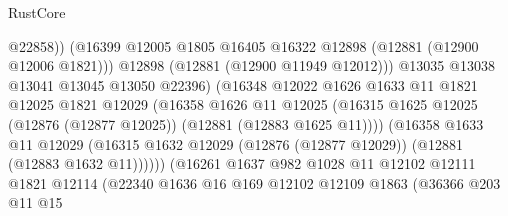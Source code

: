 \begin{lexlean}{RustCore}
\begin{coremodule}
                                      @22858))
                                  (@16399
                                    @12005
                                    @1805
                                    @16405
                                    @16322
                                    @12898
                                    (@12881 (@12900 @12006 @1821)))
                                  @12898
                                  (@12881 (@12900 @11949 @12012)))
                                @13035
                                @13038
                                @13041
                                @13045
                                @13050
                                @22396)
                              (@16348
                                @12022
                                @1626
                                @1633
                                @11
                                @1821
                                @12025
                                @1821
                                @12029
                                (@16358
                                  @1626
                                  @11
                                  @12025
                                  (@16315
                                    @1625
                                    @12025
                                    (@12876 (@12877 @12025))
                                    (@12881 (@12883 @1625 @11))))
                                (@16358
                                  @1633
                                  @11
                                  @12029
                                  (@16315
                                    @1632
                                    @12029
                                    (@12876 (@12877 @12029))
                                    (@12881 (@12883 @1632 @11))))))
                            (@16261
                              @1637
                              @982
                              @1028
                              @11
                              @12102
                              @12111
                              @1821
                              @12114
                              (@22340
                                @1636
                                @16
                                @169
                                @12102
                                @12109
                                @1863
                                (@36366
                                  @203
                                  @11
                                  @15

\end{coremodule}
\end{lexlean}
